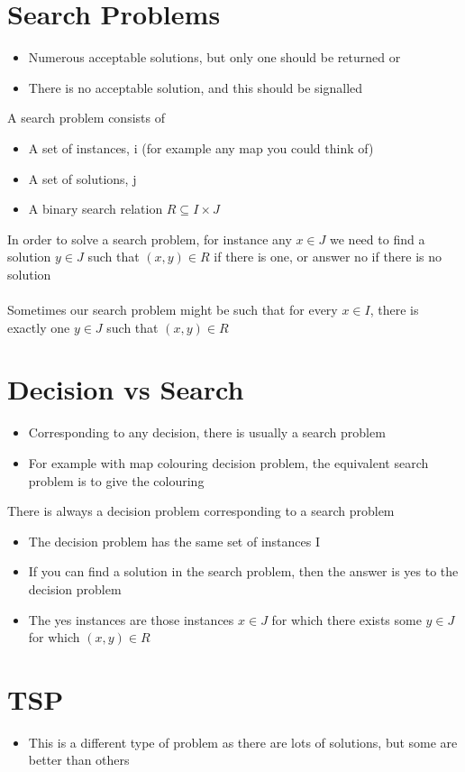 \documentclass{article}[18pt]
\begin{document}
\section{Search Problems}
\begin{itemize}
\item Numerous acceptable solutions, but only one should be returned or
\item There is no acceptable solution, and this should be signalled
\end{itemize}
A search problem consists of
\begin{itemize}
\item A set of instances, i (for example any map you could think of)
\item A set of solutions, j
\item A binary search relation $R\subseteq I\times J$
\end{itemize}
In order to solve a search problem, for instance any $x\in J$ we need to find a solution $y\in J$ such that $(x,y)\in R$ if there is one, or answer no if there is no solution\\
\\
Sometimes our search problem might be such that for every $x\in I$, there is exactly one $y\in J$ such that $(x,y)\in R$\\
\section{Decision vs Search}
\begin{itemize}
\item Corresponding to any decision, there is usually a search problem
\item For example with map colouring decision problem, the equivalent search problem is to give the colouring
\end{itemize}
There is always a decision problem corresponding to a search problem
\begin{itemize}
\item The decision problem has the same set of instances I
\item If you can find a solution in the search problem, then the answer is yes to the decision problem
\item The yes instances are those instances $x\in J$ for which there exists some $y\in J$ for which $(x,y)\in R$
\end{itemize}
\section{TSP}
\begin{itemize}
\item This is a different type of problem as there are lots of solutions, but some are better than others
\end{itemize}
\end{document}
